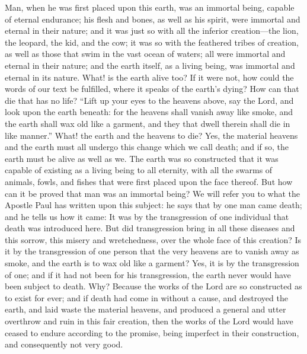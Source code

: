 Man, when he was first placed upon this earth, was an immortal being, capable of eternal
endurance; his flesh and bones, as well as his spirit, were immortal and eternal in their
nature; and it was just so with all the inferior creation—the lion, the leopard, the kid, and the
cow; it was so with the feathered tribes of creation, as well as those that swim in the vast
ocean of waters; all were immortal and eternal in their nature; and the earth itself, as a living
being, was immortal and eternal in its nature. What! is the earth alive too? If it were not, how
could the words of our text be fulfilled, where it speaks of the earth's dying? How can that
die that has no life? ``Lift up your eyes to the heavens above, say the Lord, and look upon the
earth beneath: for the heavens shall vanish away like smoke, and the earth shall wax old like
a garment, and they that dwell therein shall die in like manner.'' What! the earth and the
heavens to die? Yes, the material heavens and the earth must all undergo this change which
we call death; and if so, the earth must be alive as well as we. The earth was so constructed
that it was capable of existing as a living being to all eternity, with all the swarms of animals,
fowls, and fishes that were first placed upon the face thereof. But how can it be proved that
man was an immortal being? We will refer you to what the Apostle Paul has written upon
this subject: he says that by one man came death; and he tells us how it came: It was by the
transgression of one individual that death was introduced here. But did transgression bring in
all these diseases and this sorrow, this misery and wretchedness, over the whole face of this
creation? Is it by the transgression of one person that the very heavens are to vanish away as
smoke, and the earth is to wax old like a garment? Yes, it is by the transgression of one; and
if it had not been for his transgression, the earth never would have been subject to death.
Why? Because the works of the Lord are so constructed as to exist for ever; and if death had
come in without a cause, and destroyed the earth, and laid waste the material heavens, and
produced a general and utter overthrow and ruin in this fair creation, then the works of the
Lord would have ceased to endure according to the promise, being imperfect in their
construction, and consequently not very good.

